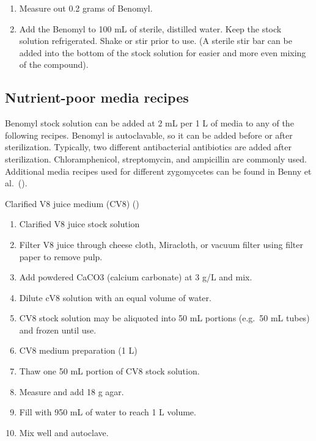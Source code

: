 \documentclass[]{book}
\providecommand{\tightlist}{%
  \setlength{\itemsep}{0pt}\setlength{\parskip}{0pt}}
\begin{document}
\begin{enumerate}
\def\labelenumi{\arabic{enumi}.}
\tightlist
\item
  Measure out 0.2 grams of Benomyl.
\item
  Add the Benomyl to 100 mL of sterile, distilled water. Keep the stock solution refrigerated. Shake or stir prior to use. (A sterile stir bar can be added into the bottom of the stock solution for easier and more even mixing of the compound).
\end{enumerate}

\hypertarget{nutrient-poor-media-recipes}{%
\subsection{Nutrient-poor media recipes}\label{nutrient-poor-media-recipes}}

Benomyl stock solution can be added at 2 mL per 1 L of media to any of the following recipes. Benomyl is autoclavable, so it can be added before or after sterilization. Typically, two different antibacterial antibiotics are added after sterilization. Chloramphenicol, streptomycin, and ampicillin are commonly used. Additional media recipes used for different zygomycetes can be found in Benny et al.~(\citeyearpar{Benny_2016}).

{Clarified V8 juice medium} (CV8) (\citet{Benny_2016})

\begin{enumerate}
\def\labelenumi{\arabic{enumi}.}
\tightlist
\item
  Clarified V8 juice stock solution
\item
  Filter V8 juice through cheese cloth, Miracloth, or vacuum filter using filter paper to remove pulp.
\item
  Add powdered CaCO3 (calcium carbonate) at 3 g/L and mix.
\item
  Dilute cV8 solution with an equal volume of water.
\item
  CV8 stock solution may be aliquoted into 50 mL portions (e.g.~50 mL tubes) and frozen until use.
\item
  CV8 medium preparation (1 L)
\item
  Thaw one 50 mL portion of CV8 stock solution.
\item
  Measure and add 18 g agar.
\item
  Fill with 950 mL of water to reach 1 L volume.
\item
  Mix well and autoclave.
\end{enumerate}
\end{document}
